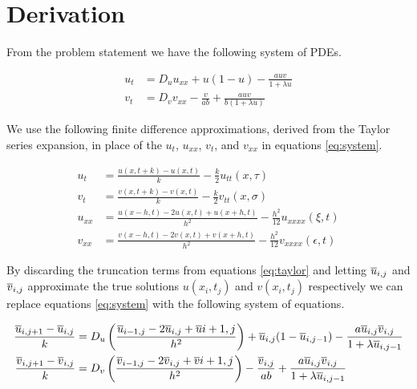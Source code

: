 \section{Derivation}

From the problem statement we have the following system of PDEs.

\begin{subequations} \label{eq:system}
\begin{align}
u_t &= D_u u_{xx} + u(1-u) - \frac{auv}{1+\lambda u} \label{eq:prey}\\
v_t &= D_v v_{xx} - \frac{v}{ab} + \frac{auv}{b(1+\lambda u)} \label{eq:pred}
\end{align}
\end{subequations}

We use the following finite difference approximations, derived from the
Taylor series expansion, in place of the $u_t$, $u_{xx}$, $v_t$, and
$v_{xx}$ in equations \eqref{eq:system}.

\begin{subequations} \label{eq:taylor}
\begin{align}
u_t &= \frac{u(x,t+k)-u(x,t)}{k} - \frac{k}{2} u_{tt}(x,\tau) \label{eq:u_t} \\
v_t &= \frac{v(x,t+k)-v(x,t)}{k} - \frac{k}{2} v_{tt}(x,\sigma) \label{eq:v_t} \\
u_{xx} &= \frac{u(x-h,t)-2u(x,t)+u(x+h,t)}{h^2} - \frac{h^2}{12} u_{xxxx}(\xi,t) \label{eq:u_xx} \\
v_{xx} &= \frac{v(x-h,t)-2v(x,t)+v(x+h,t)}{h^2} - \frac{h^2}{12} v_{xxxx}(\epsilon,t) \label{eq:v_xx}
\end{align}
\end{subequations}

By discarding the truncation terms from equations \eqref{eq:taylor} and
letting $\overline{u}_{i,j}$ and $\overline{v}_{i,j}$ approximate the true solutions
$u(x_i,t_j)$ and $v(x_i,t_j)$ respectively we can replace equations
\eqref{eq:system} with the following system of equations.

\begin{subequations} \label{eq:approx_sys}
\begin{align}
\frac{\overline{u}_{i,j+1} - \overline{u}_{i,j}}{k} &=
    D_u \left( \frac{\overline{u}_{i-1,j}-2\overline{u}_{i,j}+\overline{u}{i+1,j}}{h^2} \right) +
    \overline{u}_{i,j}(1-\overline{u}_{i,j-1}) -
    \frac{a\overline{u}_{i,j}\overline{v}_{i,j}}{1+\lambda \overline{u}_{i,j-1}} \label{eq:approx_prey}
    \\
\frac{\overline{v}_{i,j+1} - \overline{v}_{i,j}}{k} &=
    D_v \left( \frac{\overline{v}_{i-1,j}-2\overline{v}_{i,j}+\overline{v}{i+1,j}}{h^2} \right) -
    \frac{\overline{v}_{i,j}}{ab} +
    \frac{a\overline{u}_{i,j}\overline{v}_{i,j}}{1+\lambda \overline{u}_{i,j-1}} \label{eq:approx_pred}
\end{align}
\end{subequations}

